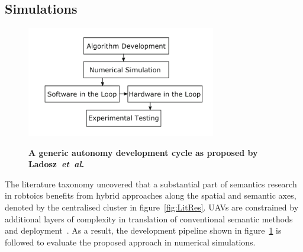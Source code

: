 \documentclass[twocolumn,letterpaper]{IEEEAerospaceCLS}  %
\newcommand{\abbreviation}[1]{\emph{#1}.}
\newcommand{\etal}{\abbreviation{et~al}}
\begin{document}
\subsection{Simulations} \label{ssec:MetSim}
\begin{figure}[h!]
    \centering
    \includegraphics[width=3.25in]{2-3DevelopmentCycle.png}\\
    \caption{\bf{A generic autonomy development cycle as proposed by Ladosz~\etal~\protect\cite{ladosz_generic_2019}}}
    \label{fig:DevProcess}
\end{figure}

The literature taxonomy uncovered that a substantial part of semantics research in robtoics benefits from hybrid approaches along the spatial and semantic axes, denoted by the centralised cluster in figure~\ref{fig:LitRes}. UAVs are constrained by additional layers of complexity in translation of conventional semantic methods and deployment~\cite{mandel_method_2020}. As a result, the development pipeline shown in figure~\ref{fig:DevProcess} is followed to evaluate the proposed approach in numerical simulations.
\end{document}
